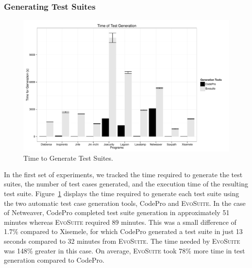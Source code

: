 \subsubsection{Generating Test Suites }
\begin{figure}[!t]
\centering
  \includegraphics[width=\linewidth]{RGraphs/TimeofGeneration.pdf}
    \caption{Time to Generate Test Suites.}
  \label{fig:TimeGen}
\end{figure}
In the first set of experiments, we tracked the time required to generate the test suites, the number of test cases generated, and the execution time of the resulting test suite.  Figure~\ref{fig:TimeGen} displays the time required to generate each test suite using the two automatic test case generation tools, CodePro and \textsc{EvoSuite}.  In the case of Netweaver, CodePro completed test suite generation in approximately 51 minutes whereas \textsc{EvoSuite} required 89 minutes.  This was a small difference of 1.7\% compared to Xisemele, for which CodePro generated a test suite in just 13 seconds compared to 32 minutes from \textsc{EvoSuite}.  The time needed by \textsc{EvoSuite} was 148\% greater in this case.  On average, \textsc{EvoSuite} took 78\% more time in test generation compared to CodePro.

